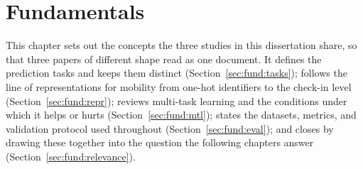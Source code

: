 
\chapter{Fundamentals}
\label{ch:fundamentals}

This chapter sets out the concepts the three studies in this dissertation share, so
that three papers of different shape read as one document. It defines the prediction
tasks and keeps them distinct (Section~\ref{sec:fund:tasks}); follows the line of
representations for mobility from one-hot identifiers to the check-in level
(Section~\ref{sec:fund:repr}); reviews multi-task learning and the conditions under
which it helps or hurts (Section~\ref{sec:fund:mtl}); states the datasets, metrics,
and validation protocol used throughout (Section~\ref{sec:fund:eval}); and closes by
drawing these together into the question the following chapters answer
(Section~\ref{sec:fund:relevance}).






